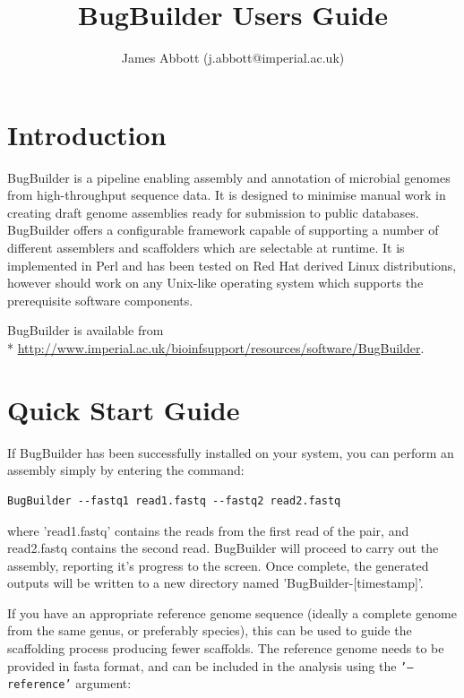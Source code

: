 \documentclass[a4paper,twoside,10pt]{article}
\title{BugBuilder Users Guide}
\author{James Abbott (j.abbott@imperial.ac.uk)}
\begin{document}
\maketitle
\tableofcontents
\newpage
\graphicspath{ {images/} }

\section{Introduction}

BugBuilder is a pipeline enabling assembly and annotation of microbial genomes from
high-throughput sequence data. It is designed to minimise manual work in creating draft genome
assemblies ready for submission to public databases. BugBuilder offers a configurable framework
capable of supporting a number of different assemblers and scaffolders which are selectable at
runtime. It is implemented in Perl and has been tested on Red Hat derived Linux distributions,
however should work on any Unix-like operating system which supports the prerequisite software
components.


BugBuilder is available from \\*
\url{http://www.imperial.ac.uk/bioinfsupport/resources/software/BugBuilder}. 

\section{Quick Start Guide}

If BugBuilder has been successfully installed on your system, you can perform an assembly simply by
entering the command:

\begin{verbatim}
BugBuilder --fastq1 read1.fastq --fastq2 read2.fastq
\end{verbatim}

where 'read1.fastq' contains the reads from the first read of the pair, and read2.fastq contains
the second read.  BugBuilder will proceed to carry out the assembly, reporting it's progress to the
screen. Once complete, the generated outputs will be written to a new directory named
'BugBuilder-[timestamp]'.

If you have an appropriate reference genome sequence (ideally a complete genome from the same
genus, or preferably species), this can be used to guide the scaffolding process producing fewer
scaffolds. The reference genome needs to be provided in fasta format, and can be included in the
analysis using the {\tt '--reference'} argument:
\end{document}
